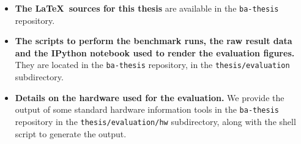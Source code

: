 \documentclass[12pt,a4paper]{book}
\begin{document}
\begin{itemize}
    \item \textbf{The \LaTeX~sources for this thesis} are available in the \texttt{ba-thesis} repository.

    \item \textbf{The scripts to perform the benchmark runs, the raw result data and the IPython notebook used to render the evaluation figures.}
        They are located in the \texttt{ba-thesis} repository, in the \texttt{thesis/evaluation} subdirectory.

    \item \textbf{Details on the hardware used for the evaluation.}
        We provide the output of some standard hardware information tools in the \texttt{ba-thesis} repository in the \texttt{thesis/evaluation/hw} subdirectory, along with the shell script to generate the output.

\end{itemize}

\cleardoublepage
{}
{}
\printbibliography
\end{document}
